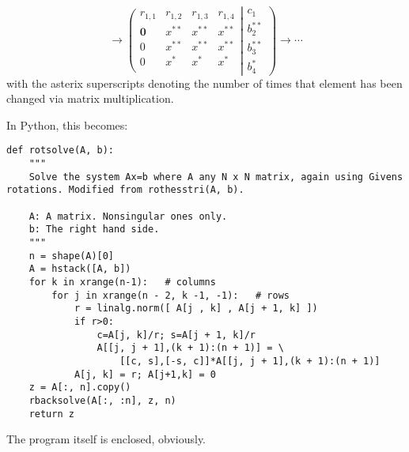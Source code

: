 \documentclass[11pt]{amsart}
\theoremstyle{definition}
\numberwithin{equation}{section}
\begin{document}
\begin{equation*}
\rightarrow
\left(
\begin{matrix}
r_{1,1}&r_{1,2}&r_{1,3}&r_{1,4} \\
\mathbf{0}&x^{**}&x^{**}&x^{**} \\
0&x^{**}&x^{**}&x^{**}\\
0&x^*&x^*&x^* \\
\end{matrix}
\right.
\left|
\begin{matrix}
c_1 \\
b_2^{**} \\
b_3^{**} \\
b_4^*
\end{matrix}
\right)
\rightarrow \cdots
\end{equation*}
with the asterix superscripts denoting the number of times 
that element has been changed via matrix multiplication.

In Python, this becomes:
\begin{lstlisting}
def rotsolve(A, b):
    """
    Solve the system Ax=b where A any N x N matrix, again using Givens rotations. Modified from rothesstri(A, b).
    
    A: A matrix. Nonsingular ones only.
    b: The right hand side.
    """
    n = shape(A)[0]
    A = hstack([A, b])
    for k in xrange(n-1):   # columns
        for j in xrange(n - 2, k -1, -1):   # rows
            r = linalg.norm([ A[j , k] , A[j + 1, k] ])
            if r>0:
                c=A[j, k]/r; s=A[j + 1, k]/r
                A[[j, j + 1],(k + 1):(n + 1)] = \
                    [[c, s],[-s, c]]*A[[j, j + 1],(k + 1):(n + 1)]
            A[j, k] = r; A[j+1,k] = 0
    z = A[:, n].copy()
    rbacksolve(A[:, :n], z, n)
    return z
\end{lstlisting}
The program itself is enclosed, obviously.
\end{document}
